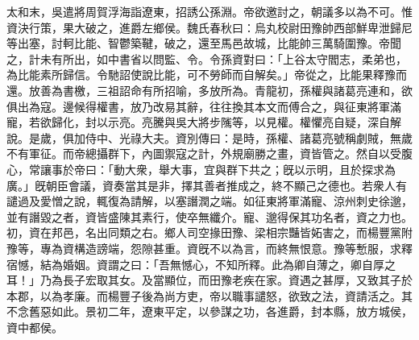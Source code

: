 \begin{pinyinscope}
太和末，吳遣將周賀浮海詣遼東，招誘公孫淵。帝欲邀討之，朝議多以為不可。惟資決行策，果大破之，進爵左鄉侯。魏氏春秋曰：烏丸校尉田豫帥西部鮮卑泄歸尼等出塞，討軻比能、智鬱築鞬，破之，還至馬邑故城，比能帥三萬騎圍豫。帝聞之，計未有所出，如中書省以問監、令。令孫資對曰：「上谷太守閻志，柔弟也，為比能素所歸信。令馳詔使說比能，可不勞師而自解矣。」帝從之，比能果釋豫而還。放善為書檄，三祖詔命有所招喻，多放所為。青龍初，孫權與諸葛亮連和，欲俱出為寇。邊候得權書，放乃改易其辭，往往換其本文而傅合之，與征東將軍滿寵，若欲歸化，封以示亮。亮騰與吳大將步隲等，以見權。權懼亮自疑，深自解說。是歲，俱加侍中、光祿大夫。資別傳曰：是時，孫權、諸葛亮號稱劇賊，無歲不有軍征。而帝總攝群下，內圖禦寇之計，外規廟勝之畫，資皆管之。然自以受腹心，常讓事於帝曰：「動大衆，舉大事，宜與群下共之；旣以示明，且於探求為廣。」旣朝臣會議，資奏當其是非，擇其善者推成之，終不顯己之德也。若衆人有譴過及愛憎之說，輒復為請解，以塞譖潤之端。如征東將軍滿寵、涼州刺史徐邈，並有譖毀之者，資皆盛陳其素行，使卒無纖介。寵、邈得保其功名者，資之力也。初，資在邦邑，名出同類之右。鄉人司空掾田豫、梁相宗豔皆妬害之，而楊豐黨附豫等，專為資構造謗端，怨隙甚重。資旣不以為言，而終無恨意。豫等慙服，求釋宿憾，結為婚姻。資謂之曰：「吾無憾心，不知所釋。此為卿自薄之，卿自厚之耳！」乃為長子宏取其女。及當顯位，而田豫老疾在家。資遇之甚厚，又致其子於本郡，以為孝廉。而楊豐子後為尚方吏，帝以職事譴怒，欲致之法，資請活之。其不念舊惡如此。景初二年，遼東平定，以參謀之功，各進爵，封本縣，放方城侯，資中都侯。


\end{pinyinscope}
